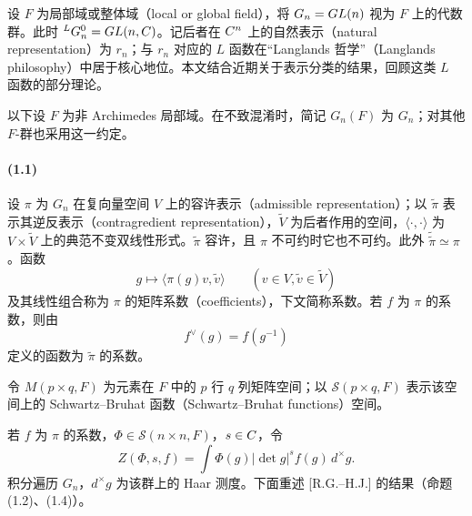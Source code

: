 设 $F$ 为局部域或整体域（local or global field），将 $G_n=GL(n)$ 视为 $F$ 上的代数群。此时 ${}^LG_n^0=GL(n,C)$。记后者在 $C^n$ 上的自然表示（natural representation）为 $r_n$；与 $r_n$ 对应的 $L$ 函数在“Langlands 哲学”（Langlands philosophy）中居于核心地位。本文结合近期关于表示分类的结果，回顾这类 $L$ 函数的部分理论。

以下设 $F$ 为非 Archimedes 局部域。在不致混淆时，简记 $G_n(F)$ 为 $G_n$；对其他 $F$-群也采用这一约定。

\paragraph*{(1.1)} 设 $\pi$ 为 $G_n$ 在复向量空间 $V$ 上的容许表示（admissible representation）；以 $\widetilde\pi$ 表示其逆反表示（contragredient representation），$\widetilde V$ 为后者作用的空间，$\langle\cdot,\cdot\rangle$ 为 $V\times\widetilde V$ 上的典范不变双线性形式。$\widetilde\pi$ 容许，且 $\pi$ 不可约时它也不可约。此外 $\widetilde{\widetilde\pi}\simeq\pi$。函数
\begin{equation}
 g\longmapsto\langle\pi(g)v,\widetilde v\rangle\qquad(v\in V,\widetilde v\in\widetilde V)\tag{1.1.1}
\end{equation}
及其线性组合称为 $\pi$ 的矩阵系数（coefficients），下文简称系数。若 $f$ 为 $\pi$ 的系数，则由
\begin{equation}
 f^\vee(g)=f(g^{-1})\tag{1.1.2}
\end{equation}
定义的函数为 $\widetilde\pi$ 的系数。

令 $M(p\times q,F)$ 为元素在 $F$ 中的 $p$ 行 $q$ 列矩阵空间；以 $\mathcal S(p\times q,F)$ 表示该空间上的 Schwartz--Bruhat 函数（Schwartz--Bruhat functions）空间。

若 $f$ 为 $\pi$ 的系数，$\Phi\in\mathcal S(n\times n,F)$，$s\in C$，令
\begin{equation}
 Z(\Phi,s,f)=\int\Phi(g)|\det g|^s f(g)\,d^\times g.\tag{1.1.3}
\end{equation}
积分遍历 $G_n$，$d^\times g$ 为该群上的 Haar 测度。下面重述 [R.G.--H.J.] 的结果（命题(1.2)、(1.4)）。

